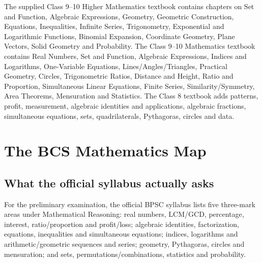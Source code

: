 \documentclass[12pt,a4paper,oneside]{book}
\begin{document}
The supplied Class 9--10 Higher Mathematics textbook contains chapters on Set and Function, Algebraic Expressions, Geometry, Geometric Construction, Equations, Inequalities, Infinite Series, Trigonometry, Exponential and Logarithmic Functions, Binomial Expansion, Coordinate Geometry, Plane Vectors, Solid Geometry and Probability. The Class 9--10 Mathematics textbook contains Real Numbers, Set and Function, Algebraic Expressions, Indices and Logarithms, One-Variable Equations, Lines/Angles/Triangles, Practical Geometry, Circles, Trigonometric Ratios, Distance and Height, Ratio and Proportion, Simultaneous Linear Equations, Finite Series, Similarity/Symmetry, Area Theorems, Mensuration and Statistics. The Class 8 textbook adds patterns, profit, measurement, algebraic identities and applications, algebraic fractions, simultaneous equations, sets, quadrilaterals, Pythagoras, circles and data.

\tableofcontents
\listoftables

\mainmatter

\chapter[BCS Mathematics Map]{The BCS Mathematics Map}
\section{What the official syllabus actually asks}
For the preliminary examination, the official BPSC syllabus lists five three-mark areas under Mathematical Reasoning: real numbers, LCM/GCD, percentage, interest, ratio/proportion and profit/loss; algebraic identities, factorization, equations, inequalities and simultaneous equations; indices, logarithms and arithmetic/geometric sequences and series; geometry, Pythagoras, circles and mensuration; and sets, permutations/combinations, statistics and probability. \cite{bpscpreli}
\end{document}
